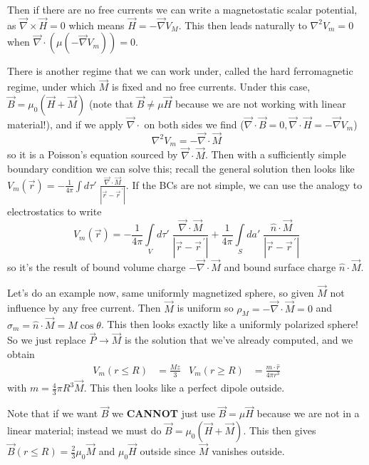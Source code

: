 \documentclass[10pt]{report}
\newcommand{\pvec}[1]{\vec{#1}^{\,\prime}}
\newcommand{\abs}[1]{\left|#1\right|}
\begin{document}
Then if there are no free currents we can write a magnetostatic scalar potential, as $\vec{\nabla}\times \vec{H} = 0$ which means $\vec{H} = -\vec{\nabla}V_M$. This then leads naturally to $\nabla^2 V_m = 0$ when $\vec{\nabla}\cdot(\mu (-\vec{\nabla}V_m)) = 0$.

There is another regime that we can work under, called the hard ferromagnetic regime, under which $\vec{M}$ is fixed and no free currents. Under this case, $\vec{B} = \mu_0(\vec{H} + \vec{M})$ (note that $\vec{B} \neq \mu\vec{H}$ because we are not working with linear material!), and if we apply $\vec{\nabla}\cdot$ on both sides we find ($\vec{\nabla}\cdot \vec{B} = 0, \vec{\nabla} \cdot \vec{H} = -\vec{\nabla}V_m$)
\begin{equation}
    \nabla^2 V_m = -\vec{\nabla}\cdot \vec{M}
\end{equation}
so it is a Poisson's equation sourced by $\vec{\nabla}\cdot \vec{M}$. Then with a sufficiently simple boundary condition we can solve this; recall the general solution then looks like $V_m(\vec{r}) = -\frac{1}{4\pi}\int\limits_{}^{}d\tau'\;\frac{\vec{\nabla}\cdot \vec{M}}{\abs{\vec{r} - \pvec{r}}}$. If the BCs are not simple, we can use the analogy to electrostatics to write
\begin{equation}
    V_m(\vec{r}) = -\frac{1}{4\pi}\int\limits_{V}^{}d\tau'\;\frac{\vec{\nabla}\cdot\vec{M}}{\abs{\vec{r} - \pvec{r}}} + \frac{1}{4\pi}\int\limits_{S}^{}da'\;\frac{\hat{n}\cdot\vec{M}}{\abs{\vec{r} - \pvec{r}}}
\end{equation}
so it's the result of bound volume charge $-\vec{\nabla}\cdot \vec{M}$ and bound surface charge $\hat{n}\cdot\vec{M}$.

Let's do an example now, same uniformly magnetized sphere, so given $\vec{M}$ not influence by any free current. Then $\vec{M}$ is uniform so $\rho_M = -\vec{\nabla}\cdot \vec{M} = 0$ and $\sigma_m = \hat{n}\cdot \vec{M} = M\cos\theta$. This then looks exactly like a uniformly polarized sphere! So we just replace $\vec{P} \to \vec{M}$ is the solution that we've already computed, and we obtain
\begin{align}
    V_m(r \leq R) &= \frac{Mz}{3} & V_m(r \geq R) &= \frac{m \cdot \hat{r}}{4\pi r^3}
\end{align}
with $m = \frac{4}{3}\pi R^3 \vec{M}$. This then looks like a perfect dipole outside.

Note that if we want $\vec{B}$ we \textbf{CANNOT} just use $\vec{B} = \mu \vec{H}$ because we are not in a linear material; instead we must do $\vec{B} = \mu_0(\vec{H} + \vec{M})$. This then gives $\vec{B}(r \leq R) = \frac{2}{3}\mu_0\vec{M}$ and $\mu_0\vec{H}$ outside since $\vec{M}$ vanishes outside.
\end{document}
